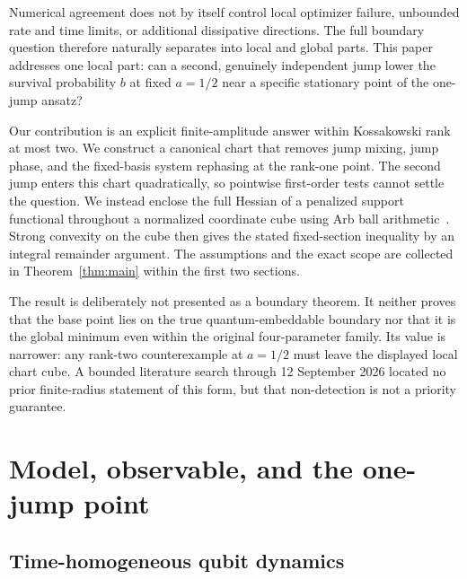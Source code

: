 \documentclass[11pt,a4paper]{article}
\begin{document}
Numerical agreement does not by itself control local optimizer failure,
unbounded rate and time limits, or additional dissipative directions.  The
full boundary question therefore naturally separates into local and global
parts.  This paper addresses one local part: can a second, genuinely
independent jump lower the survival probability $b$ at fixed $a=1/2$ near a
specific stationary point of the one-jump ansatz?

Our contribution is an explicit finite-amplitude answer within Kossakowski
rank at most two.  We construct a canonical chart that removes jump mixing,
jump phase, and the fixed-basis system rephasing at the rank-one point.  The
second jump enters this chart quadratically, so pointwise first-order tests
cannot settle the question.  We instead enclose the full Hessian of a
penalized support functional throughout a normalized coordinate cube using
Arb ball arithmetic~\cite{Johansson2017}.  Strong convexity on the cube then
gives the stated fixed-section inequality by an integral remainder argument.
The assumptions and the exact scope are collected in Theorem~\ref{thm:main}
within the first two sections.

The result is deliberately not presented as a boundary theorem.  It neither
proves that the base point lies on the true quantum-embeddable boundary nor
that it is the global minimum even within the original four-parameter
family.  Its value is narrower: any rank-two counterexample at $a=1/2$ must
leave the displayed local chart cube.  A bounded literature search through
12 September 2026 located no prior finite-radius statement of this form, but
that non-detection is not a priority guarantee.

\section{Model, observable, and the one-jump point}
\label{sec:model}

\subsection{Time-homogeneous qubit dynamics}
\end{document}
